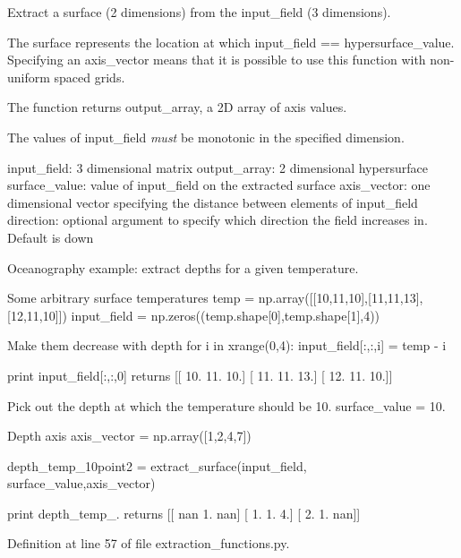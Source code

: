 Extract a surface (2 dimensions) from the input\+\_\+field (3 dimensions). 

The surface represents the location at which input\+\_\+field == hypersurface\+\_\+value. Specifying an axis\+\_\+vector means that it is possible to use this function with non-\/uniform spaced grids.

The function returns output\+\_\+array, a 2\+D array of axis values.

The values of input\+\_\+field {\itshape must} be monotonic in the specified dimension.

input\+\_\+field\+: 3 dimensional matrix output\+\_\+array\+: 2 dimensional hypersurface surface\+\_\+value\+: value of input\+\_\+field on the extracted surface axis\+\_\+vector\+: one dimensional vector specifying the distance between elements of input\+\_\+field direction\+: optional argument to specify which direction the field increases in. Default is down

Oceanography example\+: extract depths for a given temperature.

Some arbitrary surface temperatures temp = np.\+array(\mbox{[}\mbox{[}10,11,10\mbox{]},\mbox{[}11,11,13\mbox{]},\mbox{[}12,11,10\mbox{]}\mbox{]}) input\+\_\+field = np.\+zeros((temp.\+shape\mbox{[}0\mbox{]},temp.\+shape\mbox{[}1\mbox{]},4))

Make them decrease with depth for i in xrange(0,4)\+: input\+\_\+field\mbox{[}\+:,\+:,i\mbox{]} = temp -\/ i

print input\+\_\+field\mbox{[}\+:,\+:,0\mbox{]} returns \mbox{[}\mbox{[} 10. 11. 10.\mbox{]} \mbox{[} 11. 11. 13.\mbox{]} \mbox{[} 12. 11. 10.\mbox{]}\mbox{]}

Pick out the depth at which the temperature should be 10. surface\+\_\+value = 10.

Depth axis axis\+\_\+vector = np.\+array(\mbox{[}1,2,4,7\mbox{]})

depth\+\_\+temp\+\_\+10point2 = extract\+\_\+surface(input\+\_\+field, surface\+\_\+value,axis\+\_\+vector)

print depth\+\_\+temp\+\_. returns \mbox{[}\mbox{[} nan 1. nan\mbox{]} \mbox{[} 1. 1. 4.\mbox{]} \mbox{[} 2. 1. nan\mbox{]}\mbox{]} 

Definition at line 57 of file extraction\+\_\+functions.\+py.

\hypertarget{namespacemitgcm_1_1extraction__functions_ae60d3f743ac70de8a67ac7cd2c1f6758}{}
